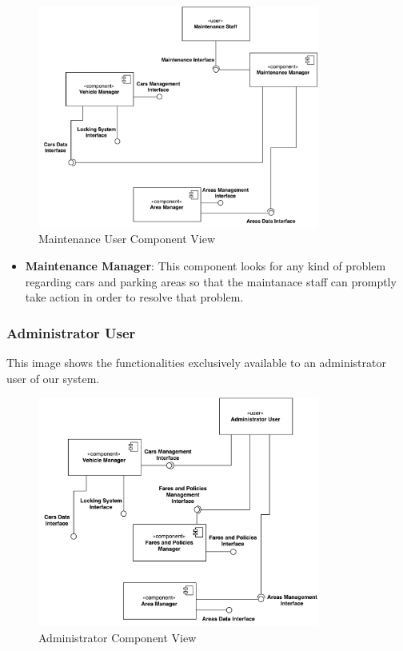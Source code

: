 \begin{figure}[H]
	\includegraphics[width=350px]{../Datas/images/MaintenanceUserComponentView.pdf}
	\caption{Maintenance User Component View}
	\label{fig:MaintenanceUserComponentView}
\end{figure}

\begin{itemize}
\item \textbf{Maintenance Manager}: This component looks for any kind of
																		problem regarding cars and parking areas so
																		that the maintanace staff can promptly take
																		action in order to resolve that problem.
\end {itemize}

\subsubsection{Administrator User}

This image shows the functionalities exclusively available to an administrator
user of our system.

\begin{figure}[H]
	\includegraphics[width=350px]{../Datas/images/AdministratorComponentView.pdf}
	\caption{Administrator Component View}
	\label{fig:AdministratorComponentView}
\end{figure}

\newpage

